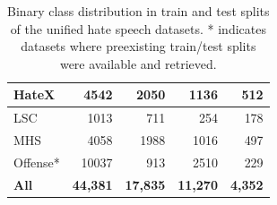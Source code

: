 \begin{table}[ht]
{\begin{tabular}{|l|rr|rr|}
HateX                                              & \multicolumn{1}{r|}{4542}              & 2050                               & \multicolumn{1}{r|}{1136}              & 512                                \\ \hline
LSC                                                     & \multicolumn{1}{r|}{1013}              & 711                                & \multicolumn{1}{r|}{254}               & 178                                \\ \hline
MHS                                                     & \multicolumn{1}{r|}{4058}              & 1988                               & \multicolumn{1}{r|}{1016}              & 497                                \\ \hline
Offense*                                              & \multicolumn{1}{r|}{10037}             & 913                               & \multicolumn{1}{r|}{2510}               & 229                                 \\ \hline
\textbf{All}                                              & \multicolumn{1}{r|}{\textbf{44,381}}             & \textbf{17,835}                               & \multicolumn{1}{r|}{\textbf{11,270}}               & \textbf{4,352}                                 \\ \hline
\end{tabular}
}
\caption{Binary class distribution in train and test splits of the unified hate speech datasets. * indicates datasets where preexisting train/test splits were available and retrieved.}
\label{tab:train_test_distributions}
\end{table}

